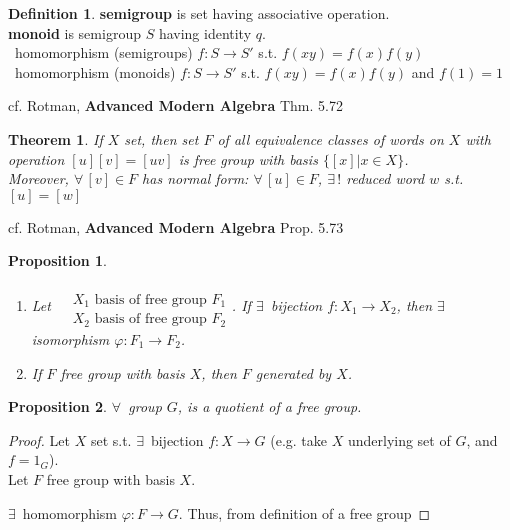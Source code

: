 \documentclass[twoside,landscape]{amsart}
\theoremstyle{plain}
\newtheorem{theorem}{Theorem}
\newtheorem{proposition}{Proposition}
\theoremstyle{definition}
\newtheorem{definition}{Definition}
\theoremstyle{remark}
\begin{document}
\begin{multicols*}{2}
\begin{definition}
  \textbf{semigroup} is set having associative operation.  \\
\textbf{monoid} is semigroup $S$ having identity $q$.  \\
\qquad \, homomorphism (semigroups) $f:S\to S'$ s.t. $f(xy) = f(x)f(y)$  \\
\qquad \, homomorphism (monoids) $f:S\to S'$ s.t. $f(xy) = f(x)f(y)$ and $f(1)=1$  
\end{definition}

cf. Rotman, \textbf{Advanced Modern Algebra} Thm. 5.72 
\begin{theorem}
If $X$ set, then set $F$ of all equivalence classes of words on $X$ with operation $[u][v] = [uv]$ is free group with basis $\lbrace [x] | x \in X \rbrace$.  \\
Moreover, $\forall \, [v] \in F$ has normal form: $\forall \, [u] \in F$, $\exists \, !$ reduced word $w$ s.t. $[u]= [w]$
\end{theorem}

cf. Rotman, \textbf{Advanced Modern Algebra} Prop. 5.73 
\begin{proposition}
  \begin{enumerate}
\item Let $\begin{aligned} & \quad \\ 
  & X_1 \text{ basis of free group } F_1 \\
  & X_2 \text{ basis of free group } F_2 \end{aligned}$.  If $\exists \, $ bijection $f:X_1 \to X_2$, then $\exists \, $ isomorphism $\varphi : F_1 \to F_2$.  
\item If $F$ free group with basis $X$, then $F$ generated by $X$.  
\end{enumerate}
\end{proposition}




\begin{proposition}
  $\forall \, $ group $G$, is a quotient of a free group.  
\end{proposition}

\begin{proof}
  Let $X$ set s.t. $\exists \, $ bijection $f:X \to G$ (e.g. take $X$ underlying set of $G$, and $f=1_G$).  \\
Let $F$ free group with basis $X$.  

$\exists \, $ homomorphism $\varphi :F\to G$.   Thus, from definition of a free group


\end{proof}
\end{multicols*}
\end{document}
